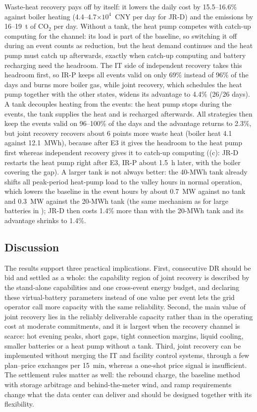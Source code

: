 Waste-heat recovery pays off by itself: it lowers the daily cost by 15.5--16.6\% against boiler heating (4.4--4.7$\times
10^4$~CNY per day for JR-D) and the emissions by 16--19~t of CO$_2$ per day. Without a tank, the heat pump competes with
catch-up computing for the channel: its load is part of the baseline, so switching it off during an event counts as
reduction, but the heat demand continues and the heat pump must catch up afterwards, exactly when catch-up computing and
battery recharging need the headroom. The IT side of independent recovery takes this headroom first, so IR-P keeps all
events valid on only 69\% instead of 96\% of the days and burns more boiler gas, while joint recovery, which schedules
the heat pump together with the other states, widens its advantage to 4.4\% (26/26 days). A tank decouples heating from
the events: the heat pump stops during the events, the tank supplies the heat and is recharged afterwards. All strategies
then keep the events valid on 96--100\% of the days and the advantage returns to 2.3\%, but joint recovery recovers about
6 points more waste heat (boiler heat 4.1 against 12.1~MWh), because after E3 it gives the headroom to the heat pump
first whereas independent recovery gives it to catch-up computing ((c): JR-D restarts the heat pump right
after E3, IR-P about 1.5~h later, with the boiler covering the gap). A larger tank is not always better: the 40-MWh tank
already shifts all peak-period heat-pump load to the valley hours in normal operation, which lowers the baseline in the
event hours by about 0.7~MW against no tank and 0.3~MW against the 20-MWh tank (the same mechanism as for large
batteries in ); JR-D then costs 1.4\% more than with the 20-MWh tank and its advantage shrinks to
1.4\%.

\subsection{Discussion}
\label{sec:discussion}

The results support three practical implications. First, consecutive DR should be bid and settled as a whole: the
capability region of joint recovery is described by the stand-alone capabilities and one cross-event energy budget, and
declaring these virtual-battery parameters instead of one value per event lets the grid operator call more capacity with
the same reliability. Second, the main value of joint recovery lies in the reliably deliverable capacity rather than in
the operating cost at moderate commitments, and it is largest when the recovery channel is scarce: hot evening peaks,
short gaps, tight connection margins, liquid cooling, smaller batteries or a heat pump without a tank. Third, joint
recovery can be implemented without merging the IT and facility control systems, through a few plan--price exchanges per
15~min, whereas a one-shot price signal is insufficient. The settlement rules matter as well: the rebound charge, the
baseline method with storage arbitrage and behind-the-meter wind, and ramp requirements change what the data center
can deliver and should be designed together with its flexibility.

